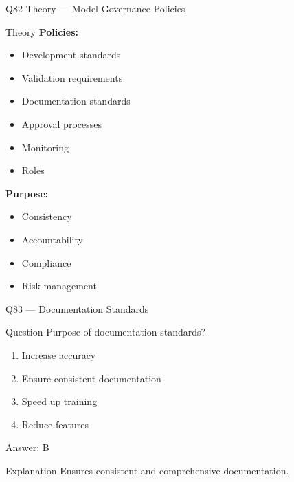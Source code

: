 \documentclass[aspectratio=169,8pt]{beamer}
\begin{document}
	\begin{frame}{Q82 Theory --- Model Governance Policies}
		\begin{block}{Theory}
			\textbf{Policies:}
			\begin{itemize}
				\item Development standards
				\item Validation requirements
				\item Documentation standards
				\item Approval processes
				\item Monitoring
				\item Roles
			\end{itemize}
			\textbf{Purpose:}
			\begin{itemize}
				\item Consistency
				\item Accountability
				\item Compliance
				\item Risk management
			\end{itemize}
		\end{block}
	\end{frame}
	
	\begin{frame}{Q83 --- Documentation Standards}
		\begin{block}{Question}
			Purpose of documentation standards?
		\end{block}
		\begin{enumerate}[label=\Alph*.]
			\item Increase accuracy
			\item Ensure consistent documentation
			\item Speed up training
			\item Reduce features
		\end{enumerate}
		\begin{exampleblock}{Answer: B}
		\end{exampleblock}
		\begin{block}{Explanation}
			Ensures consistent and comprehensive documentation.
		\end{block}
	\end{frame}
	
\end{document}
